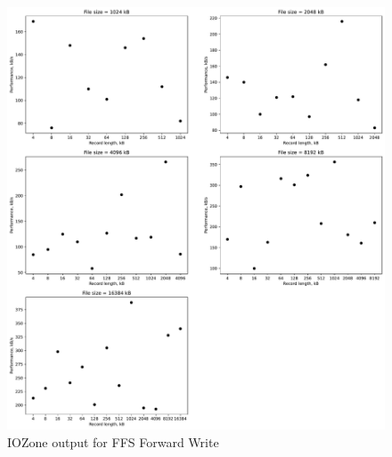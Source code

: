 \begin{figure}[!htb]
	\label{fig:app_bench_ffs_rnd_read}
	\begin{center}
		\includegraphics[width=1.0\textwidth]{figures/benchmarking/ffs/Write.pdf}
	\end{center}
	\caption{IOZone output for FFS Forward Write}
\end{figure}

